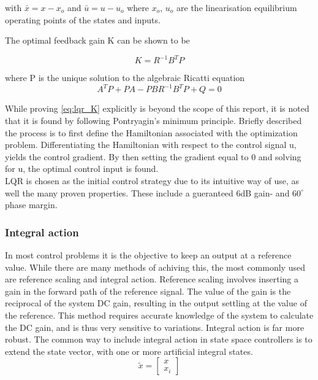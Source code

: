 with $\bar{x} = x-x_o$ and $\bar{u} = u-u_o$ where $x_o$, $u_o$ are the linearisation equilibrium operating points of the states and inputs.

The optimal feedback gain K can be shown to be

\begin{equation} \label{eq:lqr_K}
	K = R^{-1}B^{T}P
\end{equation}

where P is the unique solution to the algebraic Ricatti equation 
\begin{equation} \label{eq:ricatti}
	A^TP + PA - PBR^{-1}B^TP+Q = 0
\end{equation}

While proving \cref{eq:lqr_K} explicitly is beyond the scope of this report, it is noted that it is found by following Pontryagin's minimum principle. Briefly described the process is to first define the Hamiltonian associated with the optimization problem. Differentiating the Hamiltonian with respect to the control signal u, yields the control gradient. By then setting the gradient equal to 0 and solving for u, the optimal control input is found.
\\


LQR is chosen as the initial control strategy due to its intuitive way of use, as well the many proven properties. These include a gueranteed 6dB gain- and $60^\circ$ phase margin.

\subsubsection{Integral action}
In most control problems it is the objective to keep an output at a reference value. While there are many methods of achiving this, the most commonly used are reference scaling and integral action. Reference scaling involves inserting a gain in the forward path of the reference signal. The value of the gain is the reciprocal of the system DC gain, resulting in the output settling at the value of the reference. This method requires accurate knowledge of the system to calculate the DC gain, and is thus very sensitive to variations. Integral action is far more robust. The common way to include integral action in state space controllers is to extend the state vector, with one or more artificial integral states.
\begin{equation} 
	\tilde{x} = \begin{bmatrix}
		x \\ x_i
	\end{bmatrix}
\end{equation}

